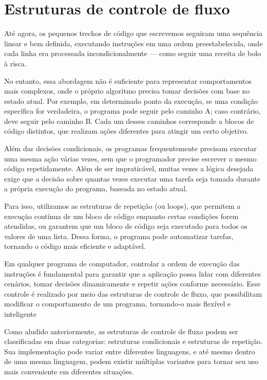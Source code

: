 \chapter{Estruturas de controle de fluxo}\label{iffor}

Até agora, os pequenos trechos de código que escrevemos seguiram uma sequência linear e bem definida, executando
instruções em uma ordem preestabelecida, onde cada linha era processada incondicionalmente --- como seguir uma receita
de bolo à risca.

No entanto, essa abordagem não é suficiente para representar comportamentos mais complexos, onde o próprio algoritmo
precisa tomar decisões com base no estado atual.
Por exemplo, em determinado ponto da execução, se uma condição específica for verdadeira, o programa pode seguir
pelo caminho A; caso contrário, deve seguir pelo caminho B.
Cada um desses caminhos corresponde a blocos de código distintos, que realizam ações diferentes para atingir um
certo objetivo.


Além das decisões condicionais, os programas frequentemente precisam executar uma mesma ação várias vezes, sem que o
programador precise escrever o mesmo código repetidamente.
Além de ser impraticável, muitas vezes a lógica desejada exige que a decisão sobre quantas vezes executar uma tarefa
seja tomada durante a própria execução do programa, baseada no estado atual.

Para isso, utilizamos as estruturas de repetição (ou loops), que permitem a execução contínua de um bloco de código
enquanto certas condições forem atendidas, ou garantem que um bloco de código seja executado para todos os valores
de uma lista.
Dessa forma, o programa pode automatizar tarefas, tornando o código mais eficiente e adaptável.

Em qualquer programa de computador, controlar a ordem de execução das instruções é fundamental para garantir que a
aplicação possa lidar com diferentes cenários, tomar decisões dinamicamente e repetir ações conforme necessário.
Esse controle é realizado por meio das estruturas de controle de fluxo, que possibilitam modificar o comportamento
de um programa, tornando-o mais flexível e inteligente

Como aludido anteriormente, as estruturas de controle de fluxo podem ser classificadas em duas categorias: estruturas
condicionais e estruturas de repetição.
Sua implementação pode variar entre diferentes linguagens, e até mesmo dentro
de uma mesma linguagem, podem existir múltiplas variantes para tornar seu uso mais conveniente em diferentes situações.

